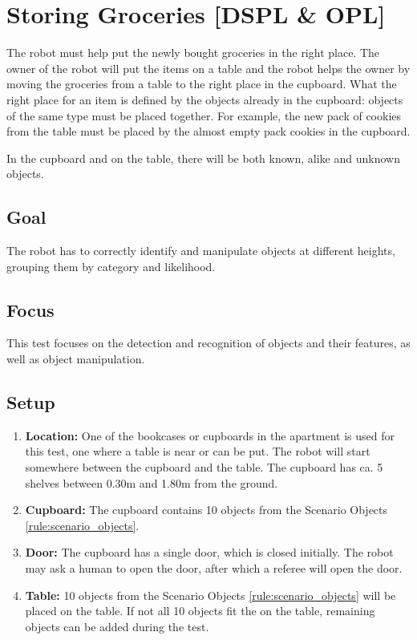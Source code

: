 \section{Storing Groceries [DSPL \& OPL]}

The robot must help put the newly bought groceries in the right place.
The owner of the robot will put the items on a table and the robot helps the owner by moving the groceries from a table to the right place in the cupboard.
What the right place for an item is defined by the objects already in the cupboard: objects of the same type must be placed together.
For example, the new pack of cookies from the table must be placed by the almost empty pack cookies in the cupboard.

In the cupboard and on the table, there will be both known, alike and unknown objects. 

\subsection{Goal}
The robot has to correctly identify and manipulate objects at different heights, grouping them by category and likelihood.

\subsection{Focus}
This test focuses on the detection and recognition of objects and their features, as well as object manipulation.

\subsection{Setup}
\begin{enumerate}
\item \textbf{Location:} One of the bookcases or cupboards in the apartment is used for this test, one where a table is near or can be put. 
The robot will start somewhere between the cupboard and the table. 
The cupboard has ca. 5 shelves between 0.30m and 1.80m from the ground. 
\item \textbf{Cupboard:} The cupboard contains 10 objects from the Scenario Objects \ref{rule:scenario_objects}. 
\item \textbf{Door:} The cupboard has a single door, which is closed initially.
The robot may ask a human to open the door, after which a referee will open the door. 
\item \textbf{Table:} 10 objects from the Scenario Objects \ref{rule:scenario_objects} will be placed on the table. If not all 10 objects fit the on the table, remaining objects can be added during the test.
\end{enumerate}

